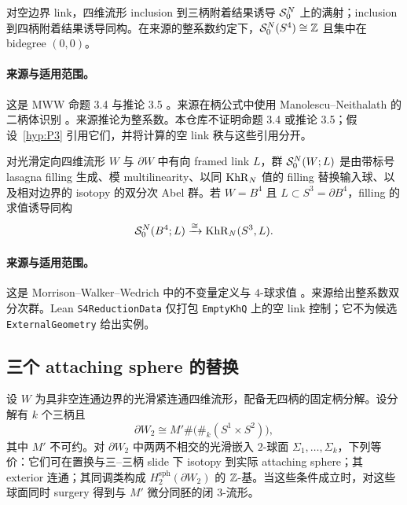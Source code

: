 \begin{externalresult}\label{prop:mww-3.4}
对空边界 link，四维流形 inclusion 到三柄附着结果诱导 $\mathcal{S}^{N}_{0}$ 上的满射；inclusion 到四柄附着结果诱导同构。在来源的整系数约定下，$\mathcal{S}^{N}_{0}(S^4)\cong\mathbb{Z}$ 且集中在 bidegree $(0,0)$。
\end{externalresult}

\paragraph{来源与适用范围。}
这是 MWW 命题 3.4 与推论 3.5 \cite[Proposition~3.4 and Corollary~3.5]{ManolescuWalkerWedrich2023}。来源在柄公式中使用 Manolescu--Neithalath 的二柄体识别 \cite{ManolescuNeithalath2020}。来源推论为整系数。本仓库不证明命题 3.4 或推论 3.5；假设~\ref{hyp:P3} 引用它们，并将计算的空 link 秩与这些引用分开。

\begin{externalresult}\label{prop:mww-B4}
对光滑定向四维流形 $W$ 与 $\partial W$ 中有向 framed link $L$，群 $\mathcal{S}^{N}_{0}(W;L)$ 是由带标号 lasagna filling 生成、模 multilinearity、以同 $\operatorname{KhR}_N$ 值的 filling 替换输入球、以及相对边界的 isotopy 的双分次 Abel 群。若 $W=B^4$ 且 $L\subset S^3=\partial B^4$，filling 的求值诱导同构
\begin{equation}\label{eq:B4-evaluation}
\mathcal{S}^{N}_{0}(B^4;L)\xrightarrow{\cong}\operatorname{KhR}_N(S^3,L).
\end{equation}
\end{externalresult}

\paragraph{来源与适用范围。}
这是 Morrison--Walker--Wedrich 中的不变量定义与 $4$-球求值 \cite[Definition~5.4 and Example~5.6]{MorrisonWalkerWedrich2019}。来源给出整系数双分次群。Lean \texttt{S4ReductionData} 仅打包 \texttt{EmptyKhQ} 上的空 link 控制；它不为候选 \texttt{ExternalGeometry} 给出实例。

\subsection{三个 attaching sphere 的替换}

\begin{externalresult}\label{prop:hj-theorem53}
设 $W$ 为具非空连通边界的光滑紧连通四维流形，配备无四柄的固定柄分解。设分解有 $k$ 个三柄且
\[
 \partial W_2\cong M'\#\bigl(\#_k(S^1\times S^2)\bigr),
\]
其中 $M'$ 不可约。对 $\partial W_2$ 中两两不相交的光滑嵌入 $2$-球面 $\Sigma_1,\ldots,\Sigma_k$，下列等价：它们可在置换与三--三柄 slide 下 isotopy 到实际 attaching sphere；其 exterior 连通；其同调类构成 $H_2^{\mathrm{sph}}(\partial W_2)$ 的 $\mathbb{Z}$-基。当这些条件成立时，对这些球面同时 surgery 得到与 $M'$ 微分同胚的闭 $3$-流形。
\end{externalresult}


